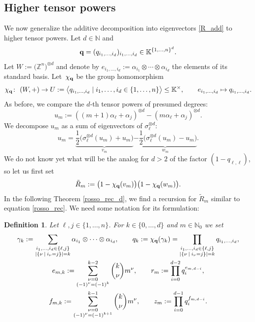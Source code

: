 \documentclass[10pt,a4paper]{amsart}
\numberwithin{equation}{section}
\newtheorem{Definition}[Theorem]{Definition}
\newcommand{\NN }{\mathbb{N}}
\newcommand{\ZZ }{\mathbb{Z}}
\newcommand{\qq }{{\bf q}}
\newcommand{\KK }{\mathbb{K}}
\newcommand{\dn }{d}
\newcommand{\qR }{\tilde R}
\newcommand{\bich }{\chi}
\begin{document}
\subsection{Higher tensor powers}\label{generalized_Rosso}
We now generalize the additive decomposition into eigenvectors \eqref{R_add} to higher tensor powers.
Let $\dn\in\NN$ and
\[\qq = (q_{i_1,\dots,i_\dn})_{i_1,\dots,i_\dn}\in \KK^{\{1,\dots,n\}^\dn}.
\]
Let $W:=\big(\ZZ^n\big)^{\otimes \dn}$ and denote by $e_{i_1,\dots,i_\dn}:=\alpha_{i_1}\otimes\cdots\otimes\alpha_{i_\dn}$ the elements of its standard basis.
Let~$\bich_\qq$ be the group homomorphism
\[ \bich_\qq \colon \ (W,+) \rightarrow U:=\big\langle q_{i_1,\dots,i_\dn} \mid i_1,\dots,i_\dn\in \{1,\dots,n\}\big\rangle\le \KK^\times,
\qquad e_{i_1,\dots,i_\dn}\mapsto q_{i_1,\dots,i_\dn}. \]
As before, we compare the $\dn$-th tensor powers of presumed degrees:
\[ u_m := ((m+1)\alpha_\ell+\alpha_j)^{\otimes \dn} - (m\alpha_\ell+\alpha_j)^{\otimes \dn}. \]
We decompose $u_m$ as a sum of eigenvectors of $\sigma_\ell^{\otimes \dn}$:
\[ u_m = \underbrace{\frac{1}{2}\big(\sigma_\ell^{\otimes \dn}(u_m)+u_m\big)}_{v_m}
\underbrace{-\frac{1}{2}\big(\sigma_\ell^{\otimes \dn}(u_m)-u_m\big)}_{w_m}. \]
We do not know yet what will be the analog for $d>2$ of the factor $(1-q_{\ell,\ell})$, so let us first set
\begin{equation*}%
\qR_m := \big(1-\bich_\qq(v_m)\big)\big(1-\bich_\qq(w_m)\big).
\end{equation*}
In the following Theorem \ref{rosso_rec_d}, we find a recursion for $\qR_m$ similar to equation \eqref{rosso_rec}. We need some notation for its formulation:

\begin{Definition}\label{def: defn of qk's}
Let $\ell,j\in\{1,\dots,n\}$.
For $k\in\{0,\dots,\dn\}$ and $m\in\NN_0$ we set
\begin{gather*}
\gamma_k := \sum_{\substack{i_1,\dots,i_\dn\in\{\ell,j\}\\ |\{\nu\:\mid\: i_\nu=j\}|=k}} \alpha_{i_1}\otimes \dots \otimes \alpha_{i_\dn},
\qquad
 q_k :=\chi_\qq(\gamma_k)= \prod_{\substack{i_1,\dots,i_\dn\in\{\ell,j\}\\ |\{\nu\:\mid\: i_\nu=j\}|=k}} q_{i_1,\dots,i_\dn},\\
 e_{m,k}:=\sum_{\substack{\nu=0 \\ (-1)^\nu=(-1)^k}}^{k-2} \binom{k}{\nu} m^\nu,
\qquad
r_m:=\prod_{i=0}^{\dn-2} q_i^{e_{m,\dn-i}},\\
f_{m,k} := \sum_{\substack{\nu=0 \\ (-1)^\nu=(-1)^{k+1}}}^{k-1} \binom{k}{\nu} m^\nu,
\qquad
z_m := \prod_{i=0}^{\dn-1} q_i^{f_{m,\dn-i}}.
\end{gather*}
\end{Definition}
\end{document}
